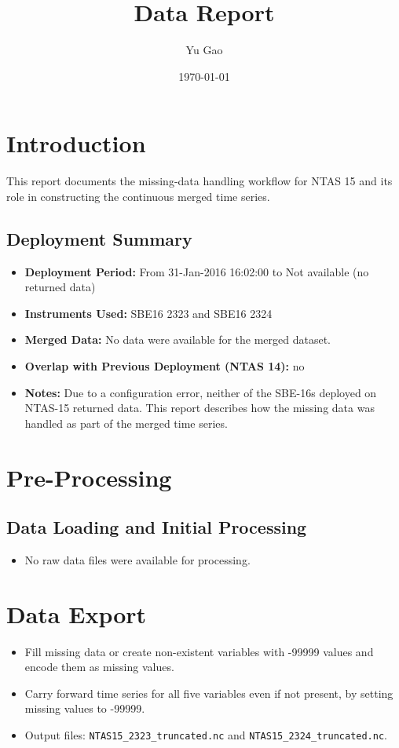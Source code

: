 \documentclass[11pt]{article}
\title{\projectname{} \casenumber{} Data Report}
\author{Yu Gao}
\date{\today}
\newcommand{\projectname}{NTAS}
\newcommand{\casenumber}{15}
\newcommand{\previouscasenumber}{14}
\newcommand{\DeploymentStart}{31-Jan-2016 16:02:00}
\newcommand{\DeploymentEnd}{Not available (no returned data)}
\newcommand{\FirstInstrumentType}{SBE16}
\newcommand{\SecondInstrumentType}{SBE16}
\newcommand{\FirstInstrument}{2323}
\newcommand{\SecondInstrument}{2324}
\begin{document}
\maketitle
\tableofcontents
\newpage

\section{Introduction}
This report documents the missing-data handling workflow for \projectname{} \casenumber{} and its role in constructing the continuous merged time series.

\subsection{Deployment Summary}
\begin{itemize}
	\item \textbf{Deployment Period:} From \DeploymentStart{} to \DeploymentEnd{}
	\item \textbf{Instruments Used:} \FirstInstrumentType{} \FirstInstrument{} and \SecondInstrumentType{} \SecondInstrument{}
	\item \textbf{Merged Data:} No data were available for the merged dataset.
	\item \textbf{Overlap with Previous Deployment (\projectname{} \previouscasenumber{}):} no
	\item \textbf{Notes:} Due to a configuration error, neither of the SBE-16s deployed on \projectname{}-\casenumber{} returned data. This report describes how the missing data was handled as part of the merged time series.
\end{itemize}

\section{Pre-Processing}
\subsection{Data Loading and Initial Processing}
\begin{itemize}
	\item No raw data files were available for processing.
\end{itemize}

\section{Data Export}
\begin{itemize}
	\item Fill missing data or create non-existent variables with -99999 values and encode them as missing values.
	\item Carry forward time series for all five variables even if not present, by setting missing values to -99999.
	\item Output files:
	\texttt{NTAS15\_\FirstInstrument\_truncated.nc} and \texttt{NTAS15\_\SecondInstrument\_truncated.nc}.
\end{itemize}
\end{document}
